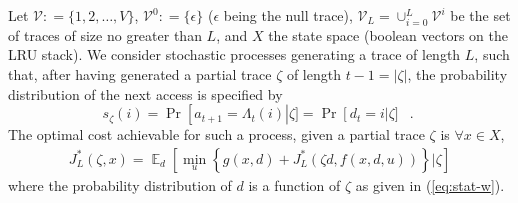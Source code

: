 \documentclass[11pt,a4paper]{article}
\DeclareMathOperator{\E}{\mathbb{E}}
\DeclareMathOperator{\Pb}{Pr}
\DeclareMathOperator{\mf}{\enspace .}
\newcommand{\deq}{\mathrel{\mathop:}=}
\theoremstyle{definition}
\theoremstyle{remark}
\begin{document}
Let $\mathcal{V}\deq\{1, 2, \ldots, V\}$,
$\mathcal{V}^0\deq\{\epsilon\}$ ($\epsilon$ being the null trace),
$\mathcal{V}_L =\cup_{i=0}^L \mathcal{V}^i$ be the set of traces of
size no greater than $L$, and $X$ the state space (boolean vectors on
the LRU stack).  We consider stochastic processes generating a trace
of length $L$, such that, after having generated a partial trace
$\zeta$ of length $t-1=|\zeta|$, the probability distribution of the
next access is specified by
\begin{equation}\label{eq:stat-w}
 s_\zeta(i)= \Pb\left[a_{t+1}=\Lambda_t(i)\right|\zeta]
           =\Pb\left[d_t=i\right|\zeta] \mf
\end{equation}
The optimal cost achievable for such a process, given a partial 
trace $\zeta$ is $\forall x \in X$,
\begin{align}
  J^*_L(\zeta,x) = \E_d\left[\min_u\left\{g(x,d)+J^*_L\left(\zeta
        d,f(x,d,u)\right)\right\} |\zeta \right]
\end{align}
where the probability distribution of $d$ is a function of $\zeta$ 
as given in (\ref{eq:stat-w}).
\end{document}
